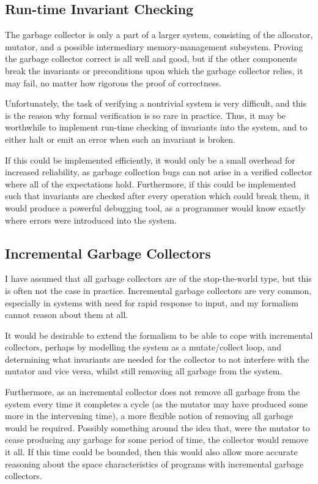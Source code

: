 \subsection{Run-time Invariant Checking}
\label{sec:conclusion-further-invariants}

The garbage collector is only a part of a larger system, consisting of
the allocator, mutator, and a possible intermediary memory-management
subsystem. Proving the garbage collector correct is all well and good,
but if the other components break the invariants or preconditions upon
which the garbage collector relies, it may fail, no matter how
rigorous the proof of correctness.

Unfortunately, the task of verifying a nontrivial system is very
difficult, and this is the reason why formal verification is so rare
in practice. Thus, it may be worthwhile to implement run-time checking
of invariants into the system, and to either halt or emit an error
when such an invariant is broken.

If this could be implemented efficiently, it would only be a small
overhead for increased reliability, as garbage collection bugs can not
arise in a verified collector where all of the expectations
hold. Furthermore, if this could be implemented such that invariants
are checked after every operation which could break them, it would
produce a powerful debugging tool, as a programmer would know exactly
where errors were introduced into the system.

\subsection{Incremental Garbage Collectors}
\label{sec:conclusion-further-incremental}

I have assumed that all garbage collectors are of the stop-the-world
type, but this is often not the case in practice. Incremental garbage
collectors are very common, especially in systems with need for rapid
response to input, and my formalism cannot reason about them at
all.

It would be desirable to extend the formalism to be able to cope with
incremental collectors, perhaps by modelling the system as a
mutate/collect loop, and determining what invariants are needed for
the collector to not interfere with the mutator and vice versa, whilst
still removing all garbage from the system.

Furthermore, as an incremental collector does not remove all garbage
from the system every time it completes a cycle (as the mutator may
have produced some more in the intervening time), a more flexible
notion of removing all garbage would be required. Possibly something
around the idea that, were the mutator to cease producing any garbage
for some period of time, the collector would remove it all. If this
time could be bounded, then this would also allow more accurate
reasoning about the space characteristics of programs with incremental
garbage collectors.

